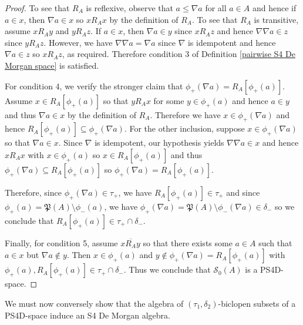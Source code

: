 \documentclass{amsart}
\theoremstyle{plain}
\theoremstyle{definition}
\begin{document}
\begin{proof}
To see that $R_A$ is reflexive, observe that $a\leq\nabla a$ for all $a\in A$ and hence if $a\in x$, then $\nabla a\in x$ so $xR_Ax$ by the definition of $R_A$. To see that $R_A$ is transitive, assume $xR_Ay$ and $yR_Az$. If $a\in x$, then $\nabla a\in y$ since $xR_Az$ and hence $\nabla\nabla a\in z$ since $yR_Az$. However, we have $\nabla\nabla a=\nabla a$ since $\nabla$ is idempotent and hence $\nabla a\in z$ so $xR_Az$, as required. Therefore condition 3 of Definition \ref{pairwise S4 De Morgan space} is satisfied. 


    
    
  
    
    
   For condition 4, we verify the stronger claim that $\phi_+(\nabla a)=R_A[\phi_+(a)]$. Assume $x\in R_A[\phi_+(a)]$ so that $yR_Ax$ for some $y\in\phi_+(a)$ and hence $a\in y$ and thus $\nabla a\in x$ by the definition of $R_A$. Therefore we have $x\in\phi_+(\nabla a)$ and hence $R_A[\phi_+(a)]\subseteq\phi_+(\nabla a)$. For the other inclusion, suppose $x\in\phi_+(\nabla a)$ so that $\nabla a\in x$. Since $\nabla$ is idempotent, our hypothesis yields $\nabla\nabla a\in x$ and hence $xR_Ax$ with $x\in\phi_+(a)$ so $x\in R_A[\phi_+(a)]$ and thus $\phi_+(\nabla a)\subseteq R_A[\phi_+(a)]$ so $\phi_+(\nabla a)=R_A[\phi_+(a)]$.
   
   
   
   
   Therefore, since $\phi_+(\nabla a)\in\tau_+$, we have $R_A[\phi_+(a)]\in\tau_+$ and since $\phi_+(a)=\mathfrak{P}(A)\setminus\phi_-(a)$, we have $\phi_+(\nabla a)=\mathfrak{P}(A)\setminus\phi_-(\nabla a)\in\delta_-$ so we conclude that $R_A[\phi_+(a)]\in\tau_+\cap\delta_-$.
   
   
   Finally, for condition 5, assume $x\overline{R_A}y$ so that there exists some $a\in A$ such that $a\in x$ but $\nabla a\not\in y$. Then $x\in\phi_+(a)$ and $y\not\in\phi_+(\nabla a)=R_A[\phi_+(a)]$ with $\phi_+(a),R_A[\phi_+(a)]\in\tau_+\cap\delta_-$. Thus we conclude that $\mathcal{S}_0(A)$ is a PS4D-space.        \end{proof}

We must now conversely show that the algebra of $(\tau_1,\delta_2)$-biclopen subsets of a PS4D-space induce an S4 De Morgan algebra.  
\end{document}
